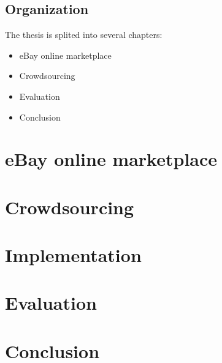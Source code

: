 \documentclass[a4paper]{report}
\begin{document}
\section{Organization}
The thesis is splited into several chapters:
\begin{itemize}
	\item eBay online marketplace
	\item Crowdsourcing
	\item Evaluation
	\item Conclusion
\end{itemize}

\chapter{eBay online marketplace}


\chapter{Crowdsourcing}


\chapter{Implementation}


\chapter{Evaluation}


\chapter{Conclusion}


\clearpage



\newpage
\begin{appendices}

\end{appendices}
\end{document}
